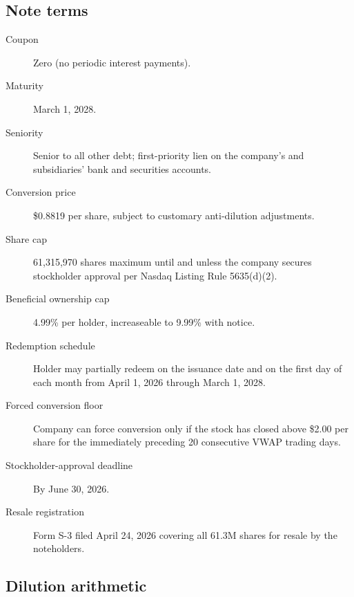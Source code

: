 \documentclass[10pt,letterpaper,twocolumn]{article}
\begin{document}
\subsection{Note terms}

\begin{description}
  \item[Coupon] Zero (no periodic interest payments).
  \item[Maturity] March 1, 2028.
  \item[Seniority] Senior to all other debt; first-priority lien on the company's and subsidiaries' bank and securities accounts.
  \item[Conversion price] \$0.8819 per share, subject to customary anti-dilution adjustments.
  \item[Share cap] 61{,}315{,}970 shares maximum until and unless the company secures stockholder approval per Nasdaq Listing Rule 5635(d)(2).
  \item[Beneficial ownership cap] 4.99\% per holder, increaseable to 9.99\% with notice.
  \item[Redemption schedule] Holder may partially redeem on the issuance date and on the first day of each month from April 1, 2026 through March 1, 2028.
  \item[Forced conversion floor] Company can force conversion only if the stock has closed above \$2.00 per share for the immediately preceding 20 consecutive VWAP trading days.
  \item[Stockholder-approval deadline] By June 30, 2026.
  \item[Resale registration] Form S-3 filed April 24, 2026 covering all 61.3M shares for resale by the noteholders.
\end{description}

\subsection{Dilution arithmetic}

\begin{table}[h]
\footnotesize
\centering
\setlength{\tabcolsep}{4pt}
\caption{Pro-forma dilution under the February 2026 note. The actual dilution depends on the spot price at the time of conversion and on whether stockholder approval is granted to remove the share cap.}
\label{tab:dilution}
\end{table}
\end{document}
